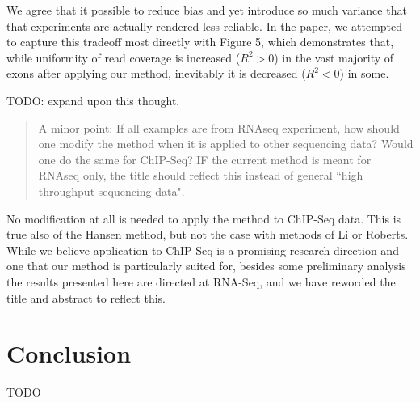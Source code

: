 \documentclass{article}
\begin{document}
We agree that it possible to reduce bias and yet introduce so much variance that
that experiments are actually rendered less reliable. In the paper, we attempted
to capture this tradeoff most directly with Figure 5, which demonstrates that,
while uniformity of read coverage is increased ($R^2 > 0$) in the vast majority
of exons after applying our method, inevitably it is decreased ($R^2 < 0$) in
some.

TODO: expand upon this thought.



\begin{quote}
A minor point: If all examples are from RNAseq experiment, how should
one modify the method when it is applied to other sequencing data?
Would one do the same for ChIP-Seq? IF the current method is meant for
RNAseq only, the title should reflect this instead of general ``high
throughput sequencing data".
\end{quote}

No modification at all is needed to apply the method to ChIP-Seq data. This is
true also of the Hansen method, but not the case with methods of Li or Roberts.
While we believe application to ChIP-Seq is a promising research direction and
one that our method is particularly suited for, besides some preliminary
analysis the results presented here are directed at RNA-Seq, and we have
reworded the title and abstract to reflect this.


\section*{Conclusion}

TODO
\end{document}
